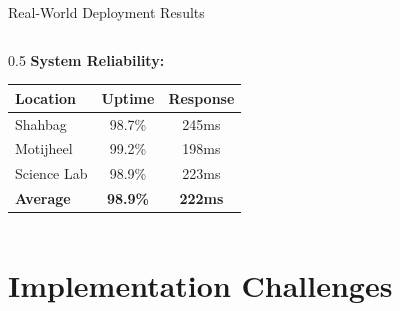 \documentclass[10pt]{beamer}
\begin{document}
\begin{frame}{Real-World Deployment Results}
\begin{columns}
\begin{column}{0.5\textwidth}
            \textbf{System Reliability:}
            \begin{table}[h]
                \tiny
                \begin{tabular}{|l|c|c|}
                    \hline
                    \textbf{Location} & \textbf{Uptime} & \textbf{Response} \\
                    \hline
                    Shahbag & 98.7\% & 245ms \\
                    Motijheel & 99.2\% & 198ms \\
                    Science Lab & 98.9\% & 223ms \\
                    \hline
                    \textbf{Average} & \textbf{98.9\%} & \textbf{222ms} \\
                    \hline
                \end{tabular}
            \end{table}
        \end{column}
    \end{columns}
\end{frame}

\section{Implementation Challenges}
\end{document}
